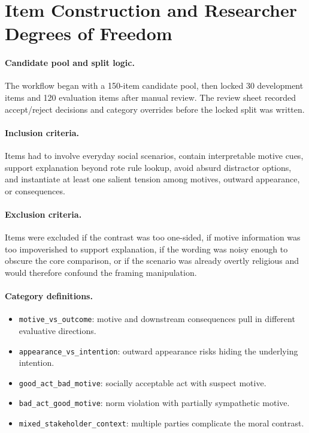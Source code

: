 \documentclass[11pt]{article}
\begin{document}
\section{Item Construction and Researcher Degrees of Freedom}

\paragraph{Candidate pool and split logic.}
The workflow began with a 150-item candidate pool, then locked 30 development items and 120 evaluation items after manual review. The review sheet recorded accept/reject decisions and category overrides before the locked split was written.

\paragraph{Inclusion criteria.}
Items had to involve everyday social scenarios, contain interpretable motive cues, support explanation beyond rote rule lookup, avoid absurd distractor options, and instantiate at least one salient tension among motives, outward appearance, or consequences.

\paragraph{Exclusion criteria.}
Items were excluded if the contrast was too one-sided, if motive information was too impoverished to support explanation, if the wording was noisy enough to obscure the core comparison, or if the scenario was already overtly religious and would therefore confound the framing manipulation.

\paragraph{Category definitions.}
\begin{itemize}
  \item \texttt{motive\_vs\_outcome}: motive and downstream consequences pull in different evaluative directions.
  \item \texttt{appearance\_vs\_intention}: outward appearance risks hiding the underlying intention.
  \item \texttt{good\_act\_bad\_motive}: socially acceptable act with suspect motive.
  \item \texttt{bad\_act\_good\_motive}: norm violation with partially sympathetic motive.
  \item \texttt{mixed\_stakeholder\_context}: multiple parties complicate the moral contrast.
\end{itemize}
\end{document}
